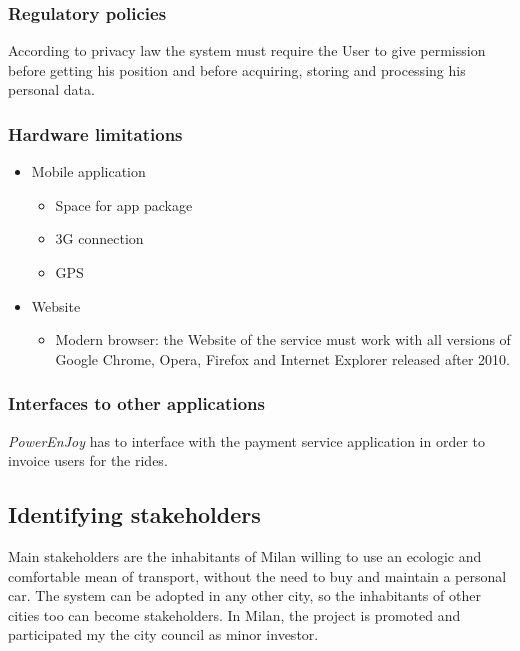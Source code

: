 \documentclass[12pt, a4paper]{article}
\begin{document}
			\subsubsection{Regulatory policies}
				According to privacy law the system must require the User to give permission before getting his position and before acquiring, storing and processing his personal data.
			
			\subsubsection{Hardware limitations}
				\begin{itemize}
					\item Mobile application
						\begin{itemize}
							\item Space for app package
							\item 3G connection
							\item GPS
						\end{itemize}
					\item Website
						\begin{itemize}
							\item Modern browser: the Website of the service must work with all versions of Google Chrome, Opera, Firefox and Internet Explorer released after 2010.	
						\end{itemize}
				\end{itemize}
			
			
			\subsubsection{Interfaces to other applications}
			\textit{PowerEnJoy} has to interface with the payment service application in order to invoice users for the rides. 
						

		\subsection{Identifying stakeholders}
			Main stakeholders are the inhabitants of Milan willing to use an ecologic and comfortable mean of transport, without the need to buy and maintain a personal car.
			The system can be adopted in any other city, so the inhabitants of other cities too can become stakeholders.
			In Milan, the project is promoted and participated my the city council as minor investor.


	\newpage
\end{document}
